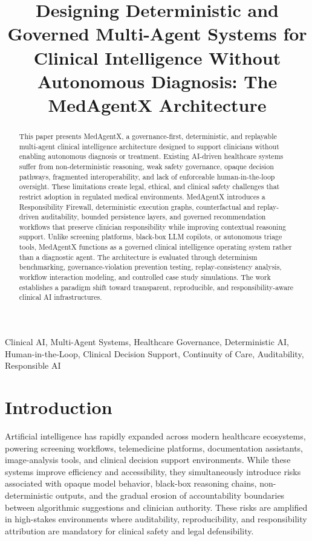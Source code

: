 \documentclass[conference]{IEEEtran}
\title{Designing Deterministic and Governed Multi-Agent Systems for Clinical Intelligence Without Autonomous Diagnosis: The MedAgentX Architecture}
\author{
\IEEEauthorblockN{Sahil Mujumdar}
\IEEEauthorblockA{Jr. Data Scientist \\
Email: mujumdarsahil05@gmail.com}
}
\begin{document}
\maketitle

\begin{abstract}
This paper presents MedAgentX, a governance-first, deterministic, and replayable multi-agent clinical intelligence architecture designed to support clinicians without enabling autonomous diagnosis or treatment. Existing AI-driven healthcare systems suffer from non-deterministic reasoning, weak safety governance, opaque decision pathways, fragmented interoperability, and lack of enforceable human-in-the-loop oversight. These limitations create legal, ethical, and clinical safety challenges that restrict adoption in regulated medical environments. MedAgentX introduces a Responsibility Firewall, deterministic execution graphs, counterfactual and replay-driven auditability, bounded persistence layers, and governed recommendation workflows that preserve clinician responsibility while improving contextual reasoning support. Unlike screening platforms, black-box LLM copilots, or autonomous triage tools, MedAgentX functions as a governed clinical intelligence operating system rather than a diagnostic agent. The architecture is evaluated through determinism benchmarking, governance-violation prevention testing, replay-consistency analysis, workflow interaction modeling, and controlled case study simulations. The work establishes a paradigm shift toward transparent, reproducible, and responsibility-aware clinical AI infrastructures.
\end{abstract}

\begin{IEEEkeywords}
Clinical AI, Multi-Agent Systems, Healthcare Governance, Deterministic AI, Human-in-the-Loop, Clinical Decision Support, Continuity of Care, Auditability, Responsible AI
\end{IEEEkeywords}

\section{Introduction}
Artificial intelligence has rapidly expanded across modern healthcare ecosystems, powering screening workflows, telemedicine platforms, documentation assistants, image-analysis tools, and clinical decision support environments. While these systems improve efficiency and accessibility, they simultaneously introduce risks associated with opaque model behavior, black-box reasoning chains, non-deterministic outputs, and the gradual erosion of accountability boundaries between algorithmic suggestions and clinician authority. These risks are amplified in high-stakes environments where auditability, reproducibility, and responsibility attribution are mandatory for clinical safety and legal defensibility.
\end{document}
